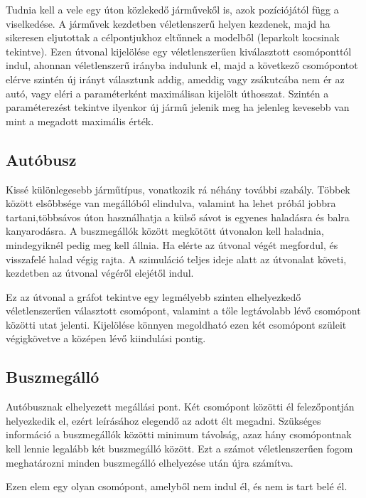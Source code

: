 Tudnia kell a vele egy úton közlekedő járművekől is, azok pozíciójától függ a viselkedése. A járművek kezdetben véletlenszerű helyen kezdenek, majd ha sikeresen eljutottak a célpontjukhoz 
eltűnnek a modelből (leparkolt kocsinak tekintve). Ezen útvonal kijelölése egy véletlenszerűen kiválasztott csomóponttól indul, ahonnan véletlenszerű irányba indulunk el, majd a következő csomópontot elérve szintén új irányt választunk addig, ameddig vagy zsákutcába nem ér az autó, vagy eléri a paraméterként maximálisan kijelölt úthosszat. Szintén a paraméterezést tekintve ilyenkor új jármű jelenik meg ha jelenleg kevesebb van mint a megadott maximális érték.
\subsection{Autóbusz}
Kissé különlegesebb járműtípus, vonatkozik rá néhány további szabály. Többek között elsőbbsége van megállóból elindulva, valamint ha lehet próbál jobbra tartani,többsávos úton használhatja a külső sávot is egyenes haladásra és balra kanyarodásra. A buszmegállók között megkötött útvonalon kell haladnia, mindegyiknél pedig meg kell állnia. Ha elérte az útvonal végét megfordul, és visszafelé halad végig rajta. A szimuláció teljes ideje alatt az útvonalat követi, kezdetben az útvonal végéről elejétől indul.

Ez az útvonal a gráfot tekintve egy legmélyebb szinten elhelyezkedő véletlenszerűen választott csomópont, valamint a tőle legtávolabb lévő csomópont közötti utat jelenti. Kijelölése könnyen megoldható ezen két csomópont szüleit végigkövetve a középen lévő kiindulási pontig.
\subsection{Buszmegálló}
Autóbusznak elhelyezett megállási pont. Két csomópont közötti él felezőpontján helyezkedik el, ezért leírásához elegendő az adott élt megadni. Szükséges információ a buszmegállók közötti minimum távolság, azaz hány csomópontnak kell lennie legalább két buszmegálló között. Ezt a számot véletlenszerűen fogom meghatározni minden buszmegálló elhelyezése után újra számítva.

Ezen elem egy olyan csomópont, amelyből nem indul él, és nem is tart belé él.
